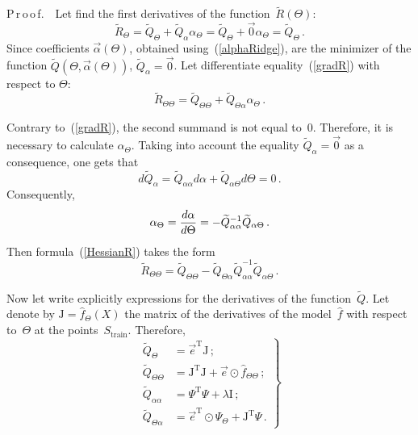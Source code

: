 \begin{multicols}{2}
\noindent
P\,r\,o\,o\,f.\ \ 
Let find the first derivatives of the function~$\widetilde R\left( \Theta \right)$:
  \begin{equation}
    \label{gradR}
    \widetilde R_\Theta = \widetilde Q_\Theta + \widetilde Q_\alpha \alpha_\Theta = \widetilde Q_\Theta + \vec0 \alpha_\Theta = \widetilde Q_\Theta\,.
  \end{equation}
   Since coefficients 
  $\vec\alpha \left( \Theta \right)$, obtained using~(\ref{alphaRidge}), 
  are the minimizer of the function
 $\widetilde Q\left( \Theta, \vec \alpha\left(\Theta\right) \right)$,
 $\widetilde Q_\alpha = \vec 0$.
  Let  differentiate equality~(\ref{gradR}) with respect to $\Theta$:
  \begin{equation}
    \label{HessianR}
    \widetilde R_{\Theta\Theta} = \widetilde Q_{\Theta\Theta} + \widetilde Q_{\Theta\alpha} \alpha_\Theta\,.
  \end{equation}

Contrary to~(\ref{gradR}), the second summand is not equal to~0. 
Therefore, it is necessary to calculate $\alpha_\Theta$.
Taking into account the equality $\widetilde Q_\alpha = \vec 0$ as a consequence, 
one gets that
\begin{equation*}
    d{\widetilde Q}_\alpha = \widetilde Q_{\alpha \alpha}d\alpha  + 
    \widetilde Q_{\alpha \Theta}d\Theta  = 0\,.
\end{equation*}
Consequently,
$$
    \alpha_\Theta = \displaystyle\frac{\displaystyle d\alpha\mathstrut}{\displaystyle d\Theta\mathstrut} = - 
    \widetilde Q_{\alpha \alpha}^{-1} \widetilde Q_{\alpha \Theta}\,.
$$
Then formula~(\ref{HessianR}) takes the form
  $$
  \widetilde R_{\Theta\Theta} =  \widetilde Q_{\Theta\Theta} - \widetilde Q_{\Theta\alpha} \widetilde Q_{\alpha \alpha}^{-1} \widetilde Q_{\alpha \Theta}\,.
  $$

Now let write explicitly expressions for the derivatives of the function~$\widetilde Q$.
Let denote by $\mathrm{J} = {\hat f_\Theta(X)}$ the matrix of the derivatives 
of the model~$\hat f$ with respect to~$\Theta$ at the points~$S_{\mathrm{train}}$.
Therefore,
  \begin{equation}
    \left.
    \begin{array}{rl}
    \widetilde Q_{\Theta} &= {\vec e}^{\mathrm{T}} \mathrm{J}\,; \\[9pt]
    \widetilde Q_{\Theta \Theta} &= \mathrm{J}^{\mathrm{T}}\mathrm{J} + 
    \vec e \odot {\hat f_{\Theta \Theta}}\,; \\[9pt]
    \widetilde Q_{\alpha \alpha} &= \Psi^{\mathrm{T}} \Psi + \lambda \mathrm{I}\,;\\[9pt]
    \widetilde Q_{\Theta\alpha} &= {\vec e}^{\mathrm{T}} \odot \Psi_\Theta + 
    \mathrm{J}^{\mathrm{T}}  \Psi\,.
    \end{array}
    \right\}
        \label{qDeriv}
  \end{equation}


\end{multicols}

